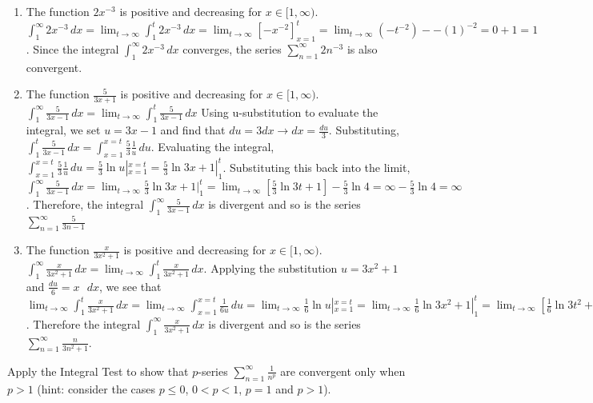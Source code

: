 \begin{Answer}[ref= series1]
\begin{enumerate}
\item The function $2x^{-3}$ is positive and decreasing for $x \in [1, \infty)$. 
$\int_1^\infty 2x^{-3}\,dx = \lim_{t \to \infty} \int_1^t 2x^{-3}\,dx = \lim_{t 
\to \infty} \left[-x^{-2} \right]_{x = 1}^t = \lim_{t \to \infty} ( -t^{-2}) - 
-(1)^{-2} = 0 + 1 = 1$. Since the integral $\int_1^\infty 2x^{-3}\,dx$ converges, 
the series $\sum_{n = 1}^\infty 2n^{-3}$ is also convergent.
\item The function $\frac{5}{3x+1}$ is positive and decreasing for $x \in [1, 
\infty)$. $\int_1^\infty \frac{5}{3x-1}\,dx = \lim_{t \to \infty} \int_1^t 
\frac{5}{3x-1}\,dx$ Using u-substitution to evaluate the integral, we set $u = 
3x-1$ and find that $du = 3dx \rightarrow dx = \frac{du}{3}$. Substituting, 
$\int_1^t \frac{5}{3x-1}\,dx = \int_{x=1}^{x=t} \frac{5}{3}\frac{1}{u}\,du$. 
Evaluating the integral, $\int_{x=1}^{x=t} \frac{5}{3}\frac{1}{u}\,du = 
\frac{5}{3}\ln{u}|_{x = 1}^{x =t} = \frac{5}{3}\ln{3x+1}|_{1}^t$. Substituting 
this back into the limit, $\int_1^\infty \frac{5}{3x-1}\,dx = \lim_{t \to 
\infty} \frac{5}{3}\ln{3x+1}|_{1}^t = \lim_{t \to \infty} [ \frac{5}{3} 
\ln{3t+1} ] - \frac{5}{3}\ln{4} = \infty - \frac{5}{3}\ln{4} = \infty$. 
Therefore, the integral $\int_1^\infty \frac{5}{3x-1}\,dx$ is divergent and so 
is the series $\sum_{n = 1}^\infty \frac{5}{3n-1}$
\item The function $\frac{x}{3x^2 + 1}$ is positive and decreasing for $x\in 
[1,\infty)$. $\int_1^\infty \frac{x}{3x^2 + 1}\,dx = \lim_{t \to \infty} 
\int_1^t \frac{x}{3x^2 + 1}\,dx$. Applying the substitution $u = 3x^2 + 1$ 
and $\frac{du}{6} = x\text{ }dx$, we see that $\lim_{t \to \infty} \int_1^t 
\frac{x}{3x^2 + 1}\,dx = \lim_{t \to \infty} \int_{x=1}^{x=t} \frac{1}{6u}\,du 
= \lim_{t \to \infty} \frac{1}{6}\ln{u}|_{x = 1}^{x = t} = \lim_{t \to \infty} 
\frac{1}{6}\ln{3x^2 + 1}|_{1}^{t} = \lim_{t \to \infty} \left[ \frac{1}{6}
\ln{3t^2 + 1} \right] - \frac{1}{6}\ln{4} = \infty$. Therefore the integral 
$\int_1^\infty \frac{x}{3x^2 + 1}\,dx$ is divergent and so is the series 
$\sum_{n = 1}^\infty \frac{n}{3n^2 + 1}$. 
\end{enumerate}
\end{Answer}

\begin{Exercise}[label = pseries]
Apply the Integral Test to show that $p$-series $\sum_{n=1}^\infty \frac{1}{
n^p}$ are convergent only when $p > 1$ (hint: consider the cases $p \leq 0$, 
$0 < p < 1$, $p=1$ and $p > 1$).
\vspace{50mm}
\end{Exercise}

